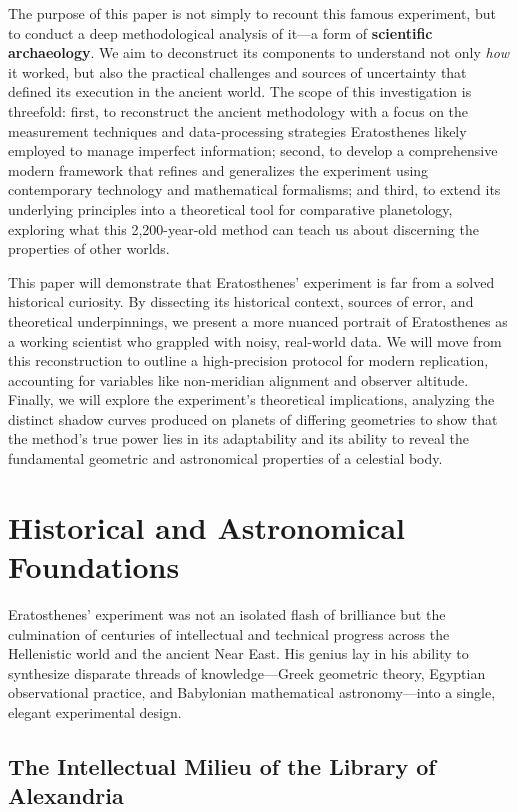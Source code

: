 \documentclass[11pt]{article}
\begin{document}
The purpose of this paper is not simply to recount this famous experiment, but to conduct a deep methodological analysis of it—a form of \textbf{scientific archaeology}. We aim to deconstruct its components to understand not only \textit{how} it worked, but also the practical challenges and sources of uncertainty that defined its execution in the ancient world. The scope of this investigation is threefold: first, to reconstruct the ancient methodology with a focus on the measurement techniques and data-processing strategies Eratosthenes likely employed to manage imperfect information; second, to develop a comprehensive modern framework that refines and generalizes the experiment using contemporary technology and mathematical formalisms; and third, to extend its underlying principles into a theoretical tool for comparative planetology, exploring what this 2,200-year-old method can teach us about discerning the properties of other worlds.

This paper will demonstrate that Eratosthenes' experiment is far from a solved historical curiosity. By dissecting its historical context, sources of error, and theoretical underpinnings, we present a more nuanced portrait of Eratosthenes as a working scientist who grappled with noisy, real-world data. We will move from this reconstruction to outline a high-precision protocol for modern replication, accounting for variables like non-meridian alignment and observer altitude. Finally, we will explore the experiment’s theoretical implications, analyzing the distinct shadow curves produced on planets of differing geometries to show that the method’s true power lies in its adaptability and its ability to reveal the fundamental geometric and astronomical properties of a celestial body.

\section{Historical and Astronomical Foundations}

Eratosthenes' experiment was not an isolated flash of brilliance but the culmination of centuries of intellectual and technical progress across the Hellenistic world and the ancient Near East. His genius lay in his ability to synthesize disparate threads of knowledge—Greek geometric theory, Egyptian observational practice, and Babylonian mathematical astronomy—into a single, elegant experimental design.

\subsection{The Intellectual Milieu of the Library of Alexandria}
\end{document}
